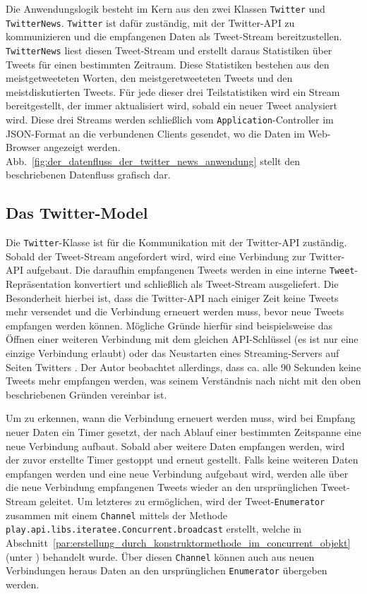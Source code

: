 Die Anwendungslogik besteht im Kern aus den zwei Klassen \lstinline|Twitter| und \lstinline|TwitterNews|.
\lstinline|Twitter| ist dafür zuständig, mit der Twitter-API zu kommunizieren und die empfangenen Daten als Tweet-Stream bereitzustellen.
\lstinline|TwitterNews| liest diesen Tweet-Stream und erstellt daraus Statistiken über Tweets für einen bestimmten Zeitraum.
Diese Statistiken bestehen aus den meistgetweeteten Worten, den meistgeretweeteten Tweets und den meistdiskutierten Tweets.
Für jede dieser drei Teilstatistiken wird ein Stream bereitgestellt, der immer aktualisiert wird, sobald ein neuer Tweet analysiert wird.
Diese drei Streams werden schließlich vom \lstinline|Application|-Controller im JSON-Format an die verbundenen Clients gesendet, wo die Daten im Web-Browser angezeigt werden.
Abb.~\ref{fig:der_datenfluss_der_twitter_news_anwendung} stellt den beschriebenen Datenfluss grafisch dar.


\subsection{Das Twitter-Model} %
\label{sub:die_twitter_klasse}

Die \lstinline|Twitter|-Klasse ist für die Kommunikation mit der Twitter-API zuständig.
Sobald der Tweet-Stream angefordert wird, wird eine Verbindung zur Twitter-API aufgebaut.
Die daraufhin empfangenen Tweets werden in eine interne \lstinline|Tweet|-Repräsentation konvertiert und schließlich als Tweet-Stream ausgeliefert.
Die Besonderheit hierbei ist, dass die Twitter-API nach einiger Zeit keine Tweets mehr versendet und die Verbindung erneuert werden muss, bevor neue Tweets empfangen werden können.
Mögliche Gründe hierfür sind beispielsweise das Öffnen einer weiteren Verbindung mit dem gleichen API-Schlüssel (es ist nur eine einzige Verbindung erlaubt) oder das Neustarten eines Streaming-Servers auf Seiten Twitters \cite[vgl.][]{twitter_connecting_to_streaming_endpoint}.
Der Autor beobachtet allerdings, dass ca. alle 90 Sekunden keine Tweets mehr empfangen werden, was seinem Verständnis nach nicht mit den oben beschriebenen Gründen vereinbar ist.

Um zu erkennen, wann die Verbindung erneuert werden muss, wird bei Empfang neuer Daten ein Timer gesetzt, der nach Ablauf einer bestimmten Zeitspanne eine neue Verbindung aufbaut.
Sobald aber weitere Daten empfangen werden, wird der zuvor erstellte Timer gestoppt und erneut gestellt.
Falls keine weiteren Daten empfangen werden und eine neue Verbindung aufgebaut wird, werden alle über die neue Verbindung empfangenen Tweets wieder an den ursprünglichen Tweet-Stream geleitet.
Um letzteres zu ermöglichen, wird der Tweet-\lstinline|Enumerator| zusammen mit einem \lstinline|Channel| mittels der Methode \lstinline|play.api.libs.iteratee.Concurrent.broadcast| erstellt, welche in Abschnitt~\ref{par:erstellung_durch_konstruktormethode_im_concurrent_objekt} (unter ) behandelt wurde.
Über diesen \lstinline|Channel| können auch aus neuen Verbindungen heraus Daten an den ursprünglichen \lstinline|Enumerator| übergeben werden.

